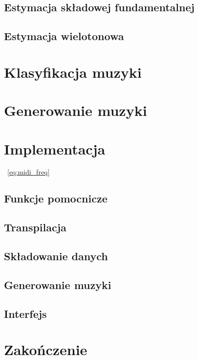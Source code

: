 \documentclass[12pt,a4paper,twoside]{mwart}
\begin{document}
\subsection{Estymacja składowej fundamentalnej}
\newpage

\subsection{Estymacja wielotonowa}


\newpage
\section{Klasyfikacja muzyki}

\section{Generowanie muzyki}
\newpage

\section{Implementacja}
\label{sec:implementacja}
~\ref{eq:midi_freq}
\subsection{Funkcje pomocnicze}
\newpage
\subsection{Transpilacja}
\newpage

\subsection{Składowanie danych}
\newpage

\subsection{Generowanie muzyki}
\newpage
\subsection{Interfejs}
\newpage
\section{Zakończenie}
\newpage


\printbibliography
\end{document}
